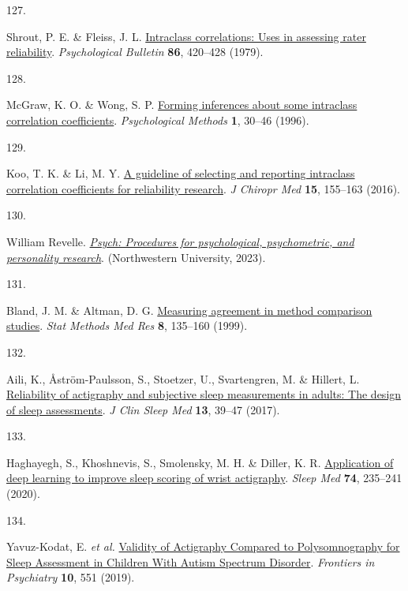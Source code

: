 \documentclass[
  10pt,
]{scrbook}
\newlength{\cslhangindent}
\newlength{\csllabelwidth}
\newlength{\cslentryspacingunit} %
\newenvironment{CSLReferences}[2] %
 {%
  \setlength{\parindent}{0pt}
  \ifodd #1
  \let\oldpar\par
  \def\par{\hangindent=\cslhangindent\oldpar}
  \fi
  \setlength{\parskip}{#2\cslentryspacingunit}
 }%
 {}
\newcommand{\CSLLeftMargin}[1]{\parbox[t]{\csllabelwidth}{#1}}
\newcommand{\CSLRightInline}[1]{\parbox[t]{\linewidth - \csllabelwidth}{#1}\break}
\let\originaltextbf\textbf
\renewcommand{\textbf}[1]{\textcolor{color1}{\textsf{\originaltextbf{#1}}}}
\begin{document}
\begin{CSLReferences}{0}{0}
\leavevmode{}%
\CSLLeftMargin{127. }%
\CSLRightInline{Shrout, P. E. \& Fleiss, J. L.
\href{https://doi.org/10.1037/0033-2909.86.2.420}{Intraclass
correlations: Uses in assessing rater reliability}. \emph{Psychological
Bulletin} \textbf{86}, 420--428 (1979).}

\leavevmode{}%
\CSLLeftMargin{128. }%
\CSLRightInline{McGraw, K. O. \& Wong, S. P.
\href{https://doi.org/10.1037/1082-989X.1.1.30}{Forming inferences about
some intraclass correlation coefficients}. \emph{Psychological Methods}
\textbf{1}, 30--46 (1996).}

\leavevmode{}%
\CSLLeftMargin{129. }%
\CSLRightInline{Koo, T. K. \& Li, M. Y.
\href{https://doi.org/10.1016/j.jcm.2016.02.012}{A guideline of
selecting and reporting intraclass correlation coefficients for
reliability research}. \emph{J Chiropr Med} \textbf{15}, 155--163
(2016).}

\leavevmode{}%
\CSLLeftMargin{130. }%
\CSLRightInline{William Revelle.
\emph{\href{https://CRAN.R-project.org/package=psych}{Psych: Procedures
for psychological, psychometric, and personality research}}.
(Northwestern University, 2023).}

\leavevmode{}%
\CSLLeftMargin{131. }%
\CSLRightInline{Bland, J. M. \& Altman, D. G.
\href{https://doi.org/10.1177/096228029900800204}{Measuring agreement in
method comparison studies}. \emph{Stat Methods Med Res} \textbf{8},
135--160 (1999).}

\leavevmode{}%
\CSLLeftMargin{132. }%
\CSLRightInline{Aili, K., Åström-Paulsson, S., Stoetzer, U.,
Svartengren, M. \& Hillert, L.
\href{https://doi.org/10.5664/jcsm.6384}{Reliability of actigraphy and
subjective sleep measurements in adults: The design of sleep
assessments}. \emph{J Clin Sleep Med} \textbf{13}, 39--47 (2017).}

\leavevmode{}%
\CSLLeftMargin{133. }%
\CSLRightInline{Haghayegh, S., Khoshnevis, S., Smolensky, M. H. \&
Diller, K. R.
\href{https://doi.org/10.1016/j.sleep.2020.05.008}{Application of deep
learning to improve sleep scoring of wrist actigraphy}. \emph{Sleep Med}
\textbf{74}, 235--241 (2020).}

\leavevmode{}%
\CSLLeftMargin{134. }%
\CSLRightInline{Yavuz-Kodat, E. \emph{et al.}
\href{https://doi.org/10.3389/fpsyt.2019.00551}{Validity of Actigraphy
Compared to Polysomnography for Sleep Assessment in Children With Autism
Spectrum Disorder}. \emph{Frontiers in Psychiatry} \textbf{10}, 551
(2019).}


\end{CSLReferences}
\end{document}
